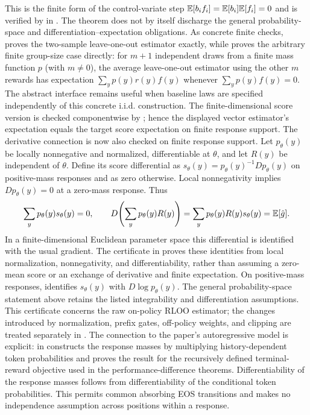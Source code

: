 This is the finite form of the control-variate step
$\mathbb{E}[b_i f_i]=\mathbb{E}[b_i]\mathbb{E}[f_i]=0$ and is verified by
 in
. The theorem does not by itself discharge
the general probability-space and differentiation--expectation obligations.
As concrete finite checks,  proves the
two-sample leave-one-out estimator exactly, while
 proves the arbitrary finite group-size case
directly: for $m+1$ independent draws from a finite mass function $p$ (with
$m\ne0$), the average leave-one-out estimator using the other $m$ rewards has
expectation $\sum_y p(y)r(y)f(y)$ whenever $\sum_y p(y)f(y)=0$. The abstract
interface  remains useful when baseline
laws are specified independently of this concrete i.i.d. construction.
The finite-dimensional score version is checked componentwise by
; hence the displayed vector estimator's
expectation equals the target score expectation on finite response support.
The derivative connection is now also checked on finite response support.
Let $p_\theta(y)$ be locally nonnegative and normalized, differentiable at
$\theta$, and let $R(y)$ be independent of $\theta$. Define its score
differential as $s_\theta(y)=p_\theta(y)^{-1}D p_\theta(y)$ on positive-mass
responses and as zero otherwise. Local nonnegativity implies
$D p_\theta(y)=0$ at a zero-mass response. Thus
\begin{equation*}
    \sum_y p_\theta(y)s_\theta(y)=0,
    \qquad
    D\!\left(\sum_y p_\theta(y)R(y)\right)
       = \sum_y p_\theta(y)R(y)s_\theta(y)
       = \mathbb{E}[\hat g].
\end{equation*}
In a finite-dimensional Euclidean parameter space this differential is
identified with the usual gradient. The certificate
 in 
proves these identities from local normalization, nonnegativity, and
differentiability, rather than assuming a zero-mean score or an exchange of
derivative and finite expectation. On positive-mass responses,
 identifies $s_\theta(y)$ with
$D\log p_\theta(y)$. The general probability-space statement above retains
the listed integrability and differentiation assumptions. This certificate
concerns the raw on-policy RLOO estimator; the changes introduced by
normalization, prefix gates, off-policy weights, and clipping are treated
separately in .
The connection to the paper's autoregressive model is explicit:
 in 
constructs the response masses by multiplying history-dependent token
probabilities and proves the result for the recursively defined terminal-reward
objective used in the performance-difference theorems. Differentiability of
the response masses follows from differentiability of the conditional token
probabilities. This permits common absorbing EOS transitions and makes no
independence assumption across positions within a response.


